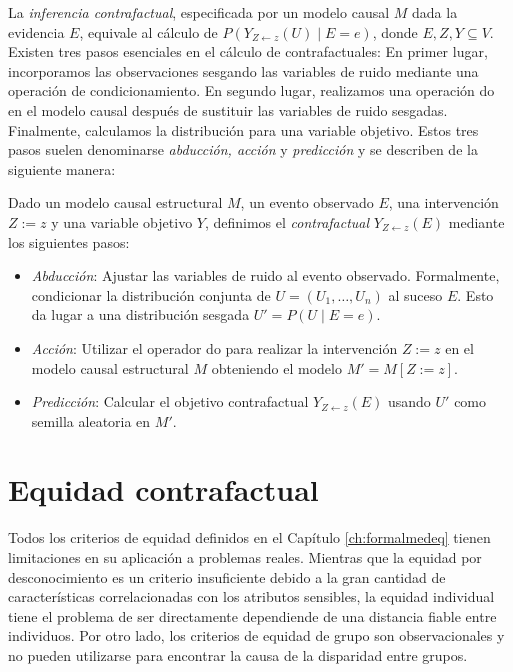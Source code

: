 \documentclass[oneside,openright,titlepage,numbers=noenddot,openany,headinclude,footinclude=true,
cleardoublepage=empty,abstractoff,BCOR=5mm,paper=a4,fontsize=12pt,main=spanish]{scrreprt}
\begin{document}
La \textit{inferencia contrafactual}, especificada por un modelo causal $M$ dada la evidencia $E$, equivale al cálculo de $P(Y_{Z\leftarrow z}(U) \mid E = e)$, donde $E, Z, Y \subseteq V$. Existen tres pasos esenciales en el cálculo de contrafactuales: En primer lugar, incorporamos las observaciones sesgando las variables de ruido mediante una operación de condicionamiento. En segundo lugar, realizamos una operación do en el modelo causal después de sustituir las variables de ruido sesgadas. Finalmente, calculamos la distribución para una variable objetivo. Estos tres pasos suelen denominarse \textit{abducción, acción} y \textit{predicción} y se describen de la siguiente manera:\\

\begin{definition} \label{def:pasoscontra}
Dado un modelo causal estructural $M$, un evento observado $E$, una intervención $Z := z$ y una variable objetivo $Y$, definimos el \textit{contrafactual} $Y_{Z \leftarrow z}(E)$ mediante los siguientes pasos:

\begin{itemize}
    \item \textit{Abducción}: Ajustar las variables de ruido al evento observado. Formalmente, condicionar la distribución conjunta de $U = (U_1,\dots,U_n)$ al suceso $E$. Esto da lugar a una distribución sesgada $U'=P(U \mid E=e)$.
    \item \textit{Acción}: Utilizar el operador do para realizar la intervención $Z := z$ en el modelo causal estructural $M$ obteniendo el modelo $M' = M[Z := z]$.
    \item \textit{Predicción}: Calcular el objetivo contrafactual $Y_{Z \leftarrow z}(E)$ usando $U'$ como semilla aleatoria en $M'$.
\end{itemize}
\end{definition}


\section{Equidad contrafactual}

Todos los criterios de equidad definidos en el Capítulo \ref{ch:formalmedeq} tienen limitaciones en su aplicación a problemas reales. Mientras que la equidad por desconocimiento es un criterio insuficiente debido a la gran cantidad de características correlacionadas con los atributos sensibles, la equidad individual tiene el problema de ser directamente dependiende de una distancia fiable entre individuos. Por otro lado, los criterios de equidad de grupo son observacionales y no pueden utilizarse para encontrar la causa de la disparidad entre grupos. 
\end{document}
